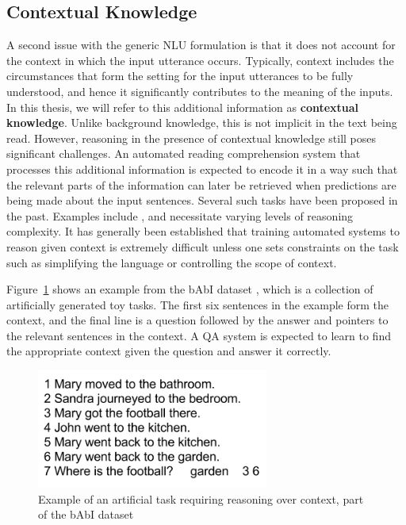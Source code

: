 \subsection{Contextual Knowledge}
A second issue with the generic NLU formulation is that it does not account for the context in which the input utterance occurs. Typically, context
includes the circumstances that form the setting for the input utterances to be fully understood, and hence it significantly contributes to the meaning of the
inputs. In this thesis, we will refer to this additional information as \textbf{contextual knowledge}. Unlike background knowledge, this is not implicit in the
text being read. However, reasoning in the presence of contextual knowledge still poses significant challenges. An automated reading comprehension system that processes this additional information
is expected to encode it in a way such that the relevant parts of the information can later be retrieved when predictions are being made about the input sentences.
Several such tasks have been proposed in the past. Examples include \cite{hill2015goldilocks,richardson2013mctest,penas2013qa4mre,breck2001looking}, and necessitate varying levels of reasoning complexity. It has generally been established
that training automated systems to reason given context is extremely difficult unless one sets constraints on the task such as simplifying the language or controlling the scope of
context.

Figure~\ref{fig:babi_example} shows an example from the bAbI dataset \citep{weston2015towards}, which is a collection of artificially generated toy tasks. The first six sentences in the example
form the context, and the final line is a question followed by the answer and pointers to the relevant sentences in the context. A QA system is expected to learn to find the appropriate context
given the question and answer it correctly.
\begin{figure}
\begin{center}
\includegraphics[width=3in]{figures/bAbI_example.png}
\caption{Example of an artificial task requiring reasoning over context, part of the bAbI dataset}
\label{fig:babi_example}
\end{center}
\end{figure}


